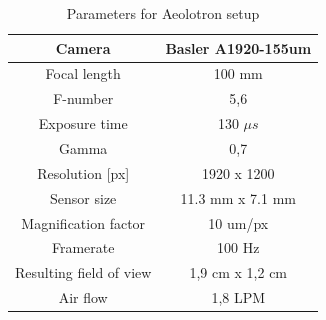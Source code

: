 		\begin{table}
			\centering
		
			\begin{tabular}{|c|c|}
			\hline 
			Camera & Basler A1920-155um \\ 
			\hline 
			Focal length & 100 mm \\ 
			\hline 
			F-number & 5,6 \\ 
			\hline 
			Exposure time & 130 $\mu s$ \\ 
			\hline 
			Gamma & 0,7 \\
			\hline
			Resolution [px] &1920 x 1200 \\
			\hline 
			Sensor size & 11.3 mm x 7.1 mm \\
			\hline 
			Magnification factor & 10 um/px \\ 
			\hline 
			Framerate & 100 Hz \\ 
			\hline 
			Resulting field of view & 1,9 cm x 1,2 cm \\
			\hline
			Air flow & 1,8 LPM  \\ 
			\hline
			\end{tabular} 
			
			\caption{Parameters for Aeolotron setup}
			\label{tab:aeolotron_setup}

		\end{table}
		
